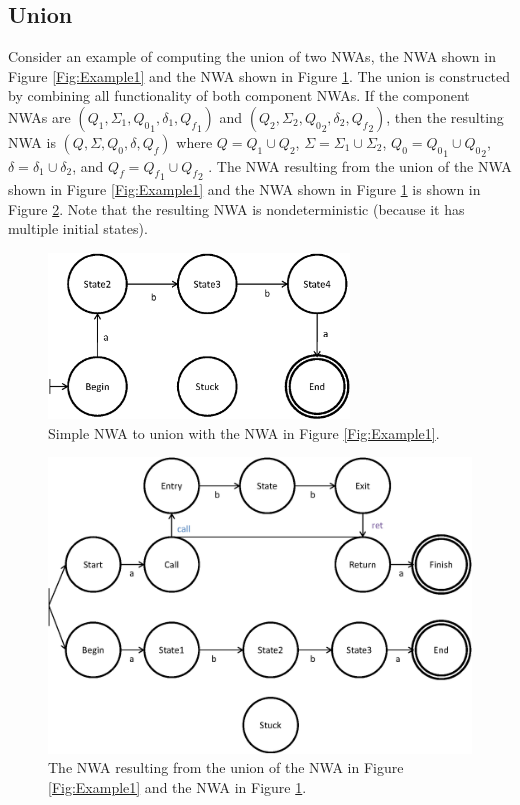 \documentclass{llncs}
\begin{document}
\subsection{Union}
\label{Se:Union}
Consider an example of computing the union of two NWAs, the NWA shown in Figure \ref{Fig:Example1} and the NWA shown in Figure \ref{Fig:Union1}.  The union is constructed by combining all functionality of both component NWAs.  If the component NWAs are $(Q_1, \Sigma_1, {Q_0}_1, \delta_1, {Q_f}_1)$ and $(Q_2, \Sigma_2, {Q_0}_2, \delta_2, {Q_f}_2)$, then the resulting NWA is $(Q, \Sigma, Q_0, \delta, Q_f)$ where $Q = Q_1 \cup Q_2$, $\Sigma = \Sigma_1 \cup \Sigma_2$, $Q_0 = {Q_0}_1 \cup {Q_0}_2$, $\delta = \delta_1 \cup \delta_2$, and $Q_f = {Q_f}_1 \cup {Q_f}_2$ .  The NWA resulting from the union of the NWA shown in Figure \ref{Fig:Example1} and the NWA shown in Figure \ref{Fig:Union1} is shown in Figure \ref{Fig:Union2}.  Note that the resulting NWA is nondeterministic (because it has multiple initial states).  

\begin{figure}[htbp]
  \centering
    \includegraphics[width=8cm]{Figures/Figure3.eps}
  \caption{Simple NWA to union with the NWA in Figure \ref{Fig:Example1}.}
  \label{Fig:Union1}
\end{figure}

\begin{figure}[htbp]
  \centering
    \includegraphics[width=12cm]{Figures/Figure4.eps}
  \caption{The NWA resulting from the union of the NWA in Figure \ref{Fig:Example1} and the NWA in Figure \ref{Fig:Union1}.}
  \label{Fig:Union2}
\end{figure}
\end{document}
